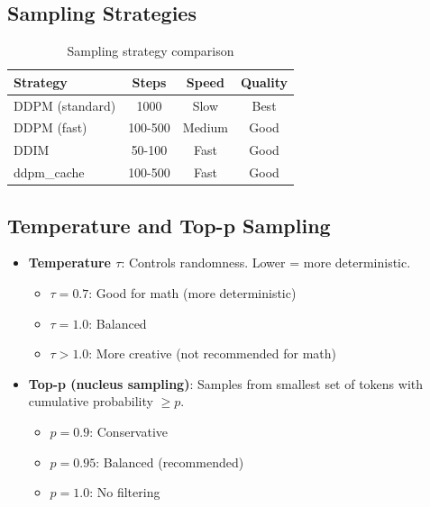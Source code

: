 \documentclass[11pt,a4paper]{article}
\begin{document}
\subsection{Sampling Strategies}

\begin{table}[H]
\centering
\caption{Sampling strategy comparison}
\begin{tabular}{lccc}
\toprule
\textbf{Strategy} & \textbf{Steps} & \textbf{Speed} & \textbf{Quality} \\
\midrule
DDPM (standard) & 1000 & Slow & Best \\
DDPM (fast) & 100-500 & Medium & Good \\
DDIM & 50-100 & Fast & Good \\
ddpm\_cache & 100-500 & Fast & Good \\
\bottomrule
\end{tabular}
\label{tab:sampling}
\end{table}

\subsection{Temperature and Top-p Sampling}

\begin{itemize}
    \item \textbf{Temperature $\tau$}: Controls randomness. Lower = more deterministic.
    \begin{itemize}
        \item $\tau = 0.7$: Good for math (more deterministic)
        \item $\tau = 1.0$: Balanced
        \item $\tau > 1.0$: More creative (not recommended for math)
    \end{itemize}
    
    \item \textbf{Top-p (nucleus sampling)}: Samples from smallest set of tokens with cumulative probability $\geq p$.
    \begin{itemize}
        \item $p = 0.9$: Conservative
        \item $p = 0.95$: Balanced (recommended)
        \item $p = 1.0$: No filtering
    \end{itemize}
\end{itemize}

\end{document}
